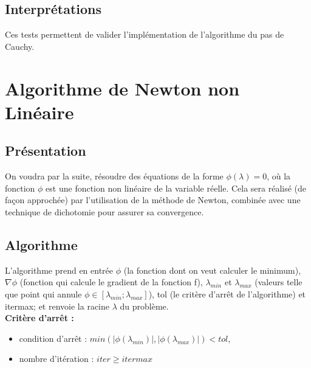 \documentclass[a4paper,12pt]{article}
\theoremstyle{break}
\begin{document}
\subsection{Interprétations}
Ces tests permettent de valider l'implémentation de l'algorithme du pas de Cauchy.

\newpage

\section{Algorithme de Newton non Linéaire}
\subsection{Présentation}

On voudra par la suite, résoudre des équations de la forme $\phi(\lambda)=0$, où la fonction $\phi$ est une fonction non linéaire de la variable réelle. Cela sera réalisé (de façon approchée) par l'utilisation de la méthode de Newton, combinée avec une technique
de dichotomie pour assurer sa convergence.

\subsection{Algorithme}

L'algorithme prend en entrée $\phi$ (la fonction dont on veut calculer le minimum), $\nabla \phi$ (fonction qui calcule le gradient de la fonction f), $\lambda_{min}$ et $\lambda_{max}$ (valeurs telle que point qui annule $\phi \in [\lambda_{min} ; \lambda_{max}]$), tol (le critère d'arrêt de l'algorithme) et itermax; et renvoie la racine $\lambda$ du problème.\\


\textbf{Critère d'arrêt : }
\begin{itemize}
\item condition d'arrêt : $min(|\phi(\lambda_{min})|, |\phi(\lambda_{max})|) < tol $,
\item nombre d'itération : $iter \geq itermax$\\
\end{itemize}
\end{document}
